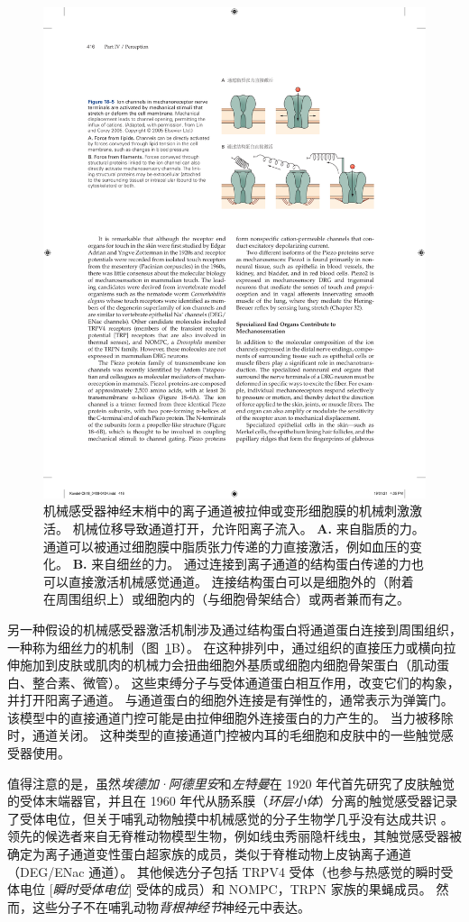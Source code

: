 \begin{figure}[htbp]
	\centering
	\includegraphics[width=0.6\linewidth]{chap18/fig_18_5}
	\caption{机械感受器神经末梢中的离子通道被拉伸或变形细胞膜的机械刺激激活。
		机械位移导致通道打开，允许阳离子流入\cite{lin2005trp}。
		\textbf{A.} 来自脂质的力。
		通道可以被通过细胞膜中脂质张力传递的力直接激活，例如血压的变化。
		\textbf{B.} 来自细丝的力。
		通过连接到离子通道的结构蛋白传递的力也可以直接激活机械感觉通道。
		连接结构蛋白可以是细胞外的（附着在周围组织上）或细胞内的（与细胞骨架结合）或两者兼而有之。}
	\label{fig:18_5}
\end{figure}


另一种假设的机械感受器激活机制涉及通过结构蛋白将通道蛋白连接到周围组织，一种称为细丝力的机制（图~\ref{fig:18_5}B）。
在这种排列中，通过组织的直接压力或横向拉伸施加到皮肤或肌肉的机械力会扭曲细胞外基质或细胞内细胞骨架蛋白（肌动蛋白、整合素、微管）。
这些束缚分子与受体通道蛋白相互作用，改变它们的构象，并打开阳离子通道。
与通道蛋白的细胞外连接是有弹性的，通常表示为弹簧门。
该模型中的直接通道门控可能是由拉伸细胞外连接蛋白的力产生的。
当力被移除时，通道关闭。
这种类型的直接通道门控被内耳的毛细胞和皮肤中的一些触觉感受器使用。


值得注意的是，虽然\textit{埃德加·阿德里安}和\textit{左特曼}在 1920 年代首先研究了皮肤触觉的受体末端器官，并且在 1960 年代从肠系膜（\textit{环层小体}）分离的触觉感受器记录了受体电位，但关于哺乳动物触摸中机械感觉的分子生物学几乎没有达成共识 。
领先的候选者来自无脊椎动物模型生物，例如线虫秀丽隐杆线虫，其触觉感受器被确定为离子通道变性蛋白超家族的成员，类似于脊椎动物上皮钠离子通道（DEG/ENac 通道）。
其他候选分子包括 TRPV4 受体（也参与热感觉的瞬时受体电位 [\textit{瞬时受体电位}] 受体的成员）和 NOMPC，TRPN 家族的果蝇成员。
然而，这些分子不在哺乳动物\textit{背根神经节}神经元中表达。



